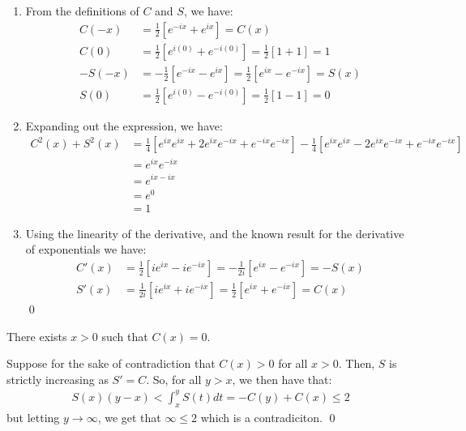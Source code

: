 \begin{nproof}
    \begin{enumerate}
        \item From the definitions of $C$ and $S$, we have:
        \begin{align*}
            C(-x) &= \frac{1}{2}\left[e^{-ix} + e^{ix}\right] = C(x)
            \\ C(0) &= \frac{1}{2}\left[e^{i(0)} + e^{-i(0)}\right] = \frac{1}{2}\left[1 + 1\right] = 1
            \\ -S(-x) &= -\frac{1}{2}\left[e^{-ix} - e^{ix}\right] = \frac{1}{2}\left[e^{ix} - e^{-ix}\right] = S(x)
            \\ S(0) &= \frac{1}{2}\left[e^{i(0)} - e^{-i(0)}\right] = \frac{1}{2}\left[1 - 1\right] = 0
        \end{align*}
        \item Expanding out the expression, we have:
        \begin{align*}
            C^2(x) + S^2(x) &= \frac{1}{4}\left[e^{ix}e^{ix} + 2e^{ix}e^{-ix} + e^{-ix}e^{-ix}\right] - \frac{1}{4}\left[e^{ix}e^{ix} - 2e^{ix}e^{-ix} + e^{-ix}e^{-ix}\right]
            \\ &= e^{ix}e^{-ix}
            \\ &= e^{ix - ix}
            \\ &= e^0
            \\ &= 1
        \end{align*}
        \item Using the linearity of the derivative, and the known result for the derivative of exponentials we have:
        \begin{align*}
            C'(x) &= \frac{1}{2}\left[ie^{ix} - ie^{-ix}\right] = -\frac{1}{2i}\left[e^{ix} - e^{-ix}\right] = -S(x)
            \\ S'(x) &= \frac{1}{2i}\left[ie^{ix} + ie^{-ix}\right] = \frac{1}{2}\left[e^{ix} + e^{-ix}\right] = C(x)
        \end{align*} \qed
    \end{enumerate}
\end{nproof}

\begin{nlemma}{}{}
    There exists $x > 0$ such that $C(x) = 0$. 
\end{nlemma}
\begin{nproof}
    Suppose for the sake of contradiction that $C(x) > 0$ for all $x > 0$. Then, $S$ is strictly increasing as $S' = C$. So, for all $y > x$, we then have that:
    \begin{align*}
        S(x)(y - x) < \int_x^y S(t)dt = -C(y) + C(x) \leq 2
    \end{align*}
    but letting $y \rightarrow \infty$, we get that $\infty \leq 2$ which is a contradiciton. \qed
\end{nproof}


